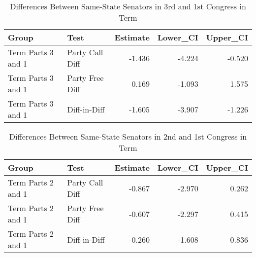 \documentclass[12pt]{article}
\begin{document}
\begin{table}[H]
	\centering
	\caption{Differences Between Same-State Senators in  3rd and 1st Congress in Term} 
	\begin{tabular}{llrrr}
		\hline
		Group & Test & Estimate & Lower\_CI & Upper\_CI \\ 
		\hline
		Term Parts 3 and 1 & Party Call Diff & -1.436 & -4.224 & -0.520 \\ 
		Term Parts 3 and 1 & Party Free Diff & 0.169 & -1.093 & 1.575 \\ 
		Term Parts 3 and 1 & Diff-in-Diff & -1.605 & -3.907 & -1.226 \\ 
		\hline
	\end{tabular}
\end{table}

\begin{table}[H]
	\centering
	\caption{Differences Between Same-State Senators in  2nd and 1st Congress in Term} 
	\begin{tabular}{llrrr}
		\hline
		Group & Test & Estimate & Lower\_CI & Upper\_CI \\ 
		\hline
		Term Parts 2 and 1 & Party Call Diff & -0.867 & -2.970 & 0.262 \\ 
		Term Parts 2 and 1 & Party Free Diff & -0.607 & -2.297 & 0.415 \\ 
		Term Parts 2 and 1 & Diff-in-Diff & -0.260 & -1.608 & 0.836 \\ 
		\hline
	\end{tabular}
\end{table}
\end{document}
